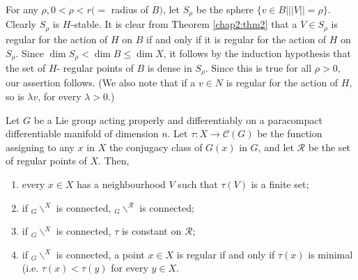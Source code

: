   For  any $ \rho, 0 <  \rho < r ( = $  radius of  $B ) $, let  $
  S_\rho $ be the  sphere  $ \{ v \in B \big| || V || = \rho \}
  $. Clearly  $ S_\rho $  is  $H$-stable. It is clear from Theorem 
  \ref{chap2:thm2}  that a  $ V \in S_\rho $  is regular for  the
  action of  $H$ 
  on $ B $  if  and only if  it is regular for the action of  $H$ on
  $S_\rho $. Since  $ \dim S_\rho < \dim B \leq \dim X $, it follows
  by the  induction  hypothesis that the  set of  $H$- regular  points
  of $ B $  is  dense in  $S_\rho $. Since   this is  true for all $
  \rho > 0 $, our assertion  follows. (We also note that if a  $v
  \in N $ is regular for  the action  of  $H$, so is  $ \lambda v$,
  for every $  \lambda > 0 $.)   

\begin{thm}\label{chap2:thm4}%
  Let $G$ be a Lie group acting properly and  differentiably on a
  paracompact differentiable manifold of  dimension $n$. Let $ \tau :
  X  \rightarrow  \mathscr{C}  ( G)  $ be the function assigning to any
  $x$   in  $X$ the conjugacy class of  $ G (x) $ in $ G $, and let
  $\mathcal{R}$ be the  set  of  regular points  of $ X$. Then, 
  \begin{enumerate}[\rm(i)]
  \item  every $x \in X$ has a neighbourhood  $V$ such that  $ \tau
    (V) $  is a  finite set; 

  \item if  $ _G \backslash ^X $  is connected, $ _G \backslash
    ^\mathcal{R}$  is  connected; 

  \item if  $ _G \backslash ^X $ is  connected,  $ \tau $ is  constant
    on $ \mathcal{R} $; 

  \item if  $ _G \backslash ^X $ is  connected, a point $ x \in X $  is
    regular if  and only if  $ \tau (x) $ is minimal  (i.e. $\tau
    (x)  < \tau ( y)$ for every  $ y \in X$.  
  \end{enumerate} 
\end{thm}  


